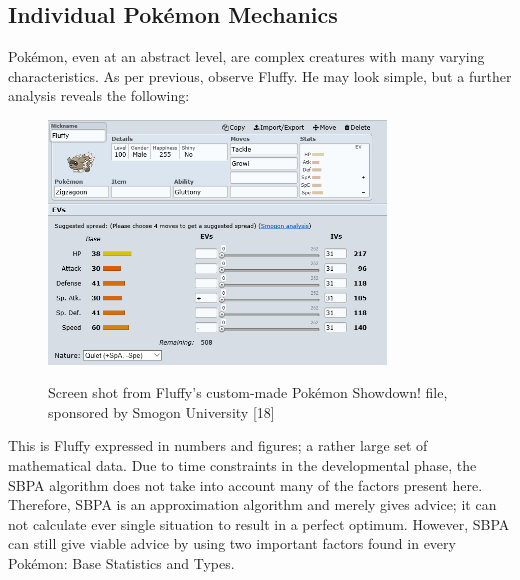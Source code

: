 \documentclass{article}
\begin{document}
\subsection{Individual Pok\'emon Mechanics}
Pok\'emon, even at an abstract level, are complex creatures with many varying characteristics. As per previous, observe Fluffy. He may look simple, but a further analysis reveals the following:
\begin{figure}[H]
	\includegraphics[width=0.8\textwidth]{fluffyfile.png}
	\centering\label{FluffyFile}
	\caption{Screen shot from Fluffy's custom-made Pok\'emon Showdown! file, sponsored by Smogon University [18]}
\end{figure}
This is Fluffy expressed in numbers and figures; a rather large set of mathematical data. Due to time constraints in the developmental phase, the SBPA algorithm does not take into account many of the factors present here. Therefore, SBPA is an approximation algorithm and merely gives advice; it can not calculate ever single situation to result in a perfect optimum. However, SBPA can still give viable advice by using two important factors found in every Pok\'emon: Base Statistics and Types.
\end{document}
